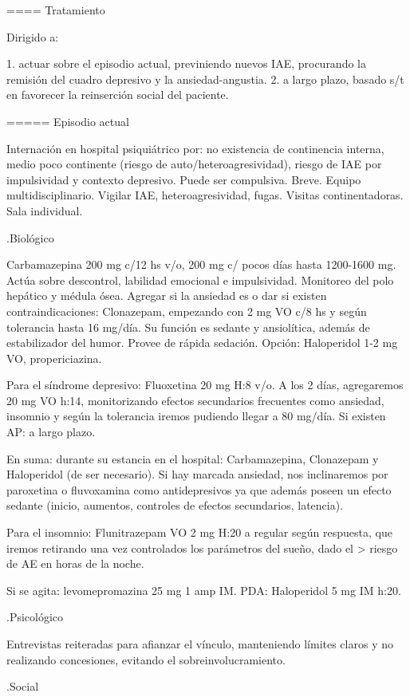 ==== Tratamiento

Dirigido a:

1. actuar sobre el episodio actual, previniendo nuevos IAE, procurando la remisión del cuadro depresivo y la ansiedad-angustia.
2. a largo plazo, basado s/t en favorecer la reinserción social del paciente.

===== Episodio actual

Internación en hospital psiquiátrico por: no existencia de continencia interna, medio poco continente (riesgo de auto/heteroagresividad), riesgo de IAE por impulsividad y contexto depresivo. Puede ser compulsiva. Breve. Equipo multidisciplinario. Vigilar IAE, heteroagresividad, fugas. Visitas continentadoras. Sala individual.

.Biológico

Carbamazepina 200 mg c/12 hs v/o, 200 mg c/ pocos días hasta 1200-1600 mg. Actúa sobre descontrol, labilidad emocional e impulsividad. Monitoreo del polo hepático y médula ósea. Agregar si la ansiedad es o dar si existen contraindicaciones: Clonazepam, empezando con 2 mg VO c/8 hs y según tolerancia hasta 16 mg/día. Su función es sedante y ansiolítica, además de estabilizador del humor. Provee de rápida sedación. Opción: Haloperidol 1-2 mg VO, propericiazina.

Para el síndrome depresivo: Fluoxetina 20 mg H:8 v/o. A los 2 días, agregaremos 20 mg VO h:14, monitorizando efectos secundarios frecuentes como ansiedad, insomnio y según la tolerancia iremos pudiendo llegar a 80 mg/día. Si existen AP: a largo plazo.

En suma: durante su estancia en el hospital: Carbamazepina, Clonazepam y Haloperidol (de ser necesario). Si hay marcada ansiedad, nos inclinaremos por paroxetina o fluvoxamina como antidepresivos ya que además poseen un efecto sedante (inicio, aumentos, controles de efectos secundarios, latencia).

Para el insomnio: Flunitrazepam VO 2 mg H:20 a regular según respuesta, que iremos retirando una vez controlados los parámetros del sueño, dado el > riesgo de AE en horas de la noche.

Si se agita: levomepromazina 25 mg 1 amp IM. PDA: Haloperidol 5 mg IM h:20.

.Psicológico

Entrevistas reiteradas para afianzar el vínculo, manteniendo límites claros y no realizando concesiones, evitando el sobreinvolucramiento.

.Social

